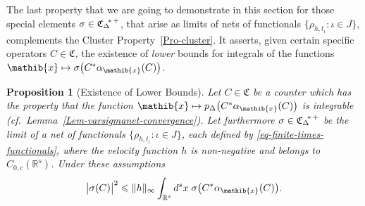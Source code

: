 \documentclass[11pt,twoside,openright]{report}
\theoremstyle{definition}
\theoremstyle{plain}
\newtheorem{Pro}[Def]{Proposition}
\theoremstyle{remark}
\theoremstyle{assumption}
\newcommand{\bset}[1]{\bigl\{ #1 \bigr\}}
\newcommand{\babs}[1]{\bigl\lvert #1 \bigr\rvert}
\newcommand{\norm}[1]{\lVert #1 \rVert}
\newcommand{\bpDx}[1]{p_\Delta \bigl( #1 \bigr)}
\newcommand{\Cfrak}{\mathfrak{C}}
\newcommand{\xib}{\mathib{x}}
\newcommand{\Rs}{\mathbb{R}^s}
\newcommand{\CDstarplus}{{\mathfrak{C}_\Delta}^{\negthickspace *
    \thinspace +}}
\newcommand{\aibx}{\alpha_\mathib{x}}
\begin{document}
The last property that we are going to demonstrate in this section for
those special elements $\sigma \in \CDstarplus$, that arise as limits
of nets of functionals $\bset{\rho_{h , t_\iota} : \iota \in J}$,
complements the Cluster Property~\ref{Pro-cluster}. It asserts, given
certain specific operators $C \in \Cfrak$, the existence of
\emph{lower} bounds for integrals of the functions $\xib \mapsto
\sigma \bigl( C^* \aibx ( C ) \bigr)$.
\begin{Pro}[Existence of Lower Bounds]
  \label{Pro-lower-bounds}
  Let $C \in \Cfrak$ be a counter which has the property that the
  function $\xib \mapsto \bpDx{C^* \aibx ( C )}$ is integrable
  (cf.~Lemma~\ref{Lem-varsigmanet-convergence}). Let furthermore
  $\sigma \in \CDstarplus$ be the limit of a net of functionals
  $\bset{\rho_{h , t_\iota} : \iota \in J}$, each defined by
  \eqref{eq-finite-times-functionals}, where the velocity function $h$
  is non-negative and belongs to $C_{0 , c} ( \Rs )$. Under these
  assumptions
  \begin{equation}
    \label{eq-lower-bounds}
    \babs{\sigma ( C )}^2 \leqslant \norm{h}_\infty \int_{\Rs} d^s x
    \; \sigma \bigl( C^* \aibx ( C ) \bigr) \text{.}
  \end{equation}
\end{Pro}
\end{document}

